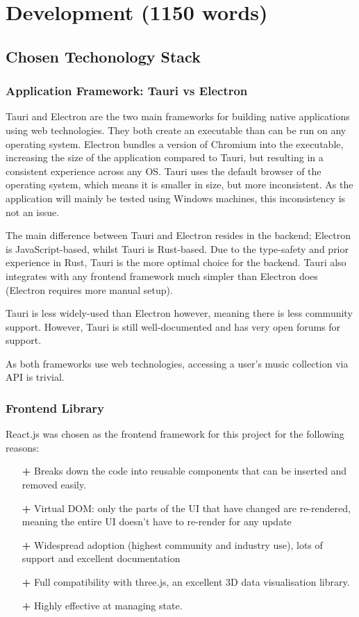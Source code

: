 \chapter{Development (1150 words)}
\section{Chosen Techonology Stack}
\subsection{Application Framework: Tauri vs Electron}
Tauri and Electron are the two main frameworks for building native applications using web technologies. They both create an executable than can be run on any operating system. Electron bundles a version of Chromium into the executable, increasing the size of the application compared to Tauri, but resulting in a consistent experience across any OS. Tauri uses the default browser of the operating system, which means it is smaller in size, but more inconsistent. As the application will mainly be tested using Windows machines, this inconsistency is not an issue.

The main difference between Tauri and Electron resides in the backend; Electron is JavaScript-based, whilst Tauri is Rust-based. Due to the type-safety and prior experience in Rust, Tauri is the more optimal choice for the backend. Tauri also integrates with any frontend framework much simpler than Electron does (Electron requires more manual setup). 

Tauri is less widely-used than Electron however, meaning there is less community support. However, Tauri is still well-documented and has very open forums for support.

As both frameworks use web technologies, accessing a user's music collection via API is trivial.

\subsection{Frontend Library}
React.js was chosen as the frontend framework for this project for the following reasons:\begin{itemize}
    \item[\textbf{+}] Breaks down the code into reusable components that can be inserted and removed easily.
    \item[\textbf{+}] Virtual DOM: only the parts of the UI that have changed are re-rendered, meaning the entire UI doesn't have to re-render for any update
    \item[\textbf{+}] Widespread adoption (highest community and industry use), lots of support and excellent documentation
    \item[\textbf{+}] Full compatibility with three.js, an excellent 3D data visualisation library.
    \item[\textbf{+}] Highly effective at managing state.
\end{itemize}

